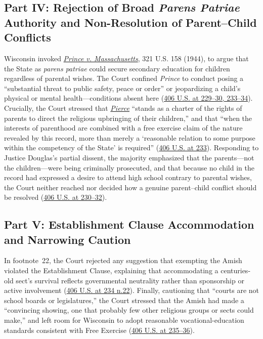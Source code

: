 \documentclass[12pt]{article}
\begin{document}
\subsection{Part IV: Rejection of Broad \emph{Parens Patriae} Authority and Non-Resolution of Parent--Child Conflicts}

Wisconsin invoked \href{https://supreme.justia.com/cases/federal/us/321/158/}{\emph{Prince v. Massachusetts}}, 321 U.S. 158 (1944), to argue that the State as \emph{parens patriae} could secure secondary education for children regardless of parental wishes. The Court confined \emph{Prince} to conduct posing a ``substantial threat to public safety, peace or order'' or jeopardizing a child's physical or mental health---conditions absent here (\href{https://supreme.justia.com/cases/federal/us/406/205/}{406 U.S. at 229--30, 233--34}). Crucially, the Court stressed that \href{https://supreme.justia.com/cases/federal/us/268/510/}{\emph{Pierce}} ``stands as a charter of the rights of parents to direct the religious upbringing of their children,'' and that ``when the interests of parenthood are combined with a free exercise claim of the nature revealed by this record, more than merely a `reasonable relation to some purpose within the competency of the State' is required'' (\href{https://supreme.justia.com/cases/federal/us/406/205/}{406 U.S. at 233}). Responding to Justice Douglas's partial dissent, the majority emphasized that the parents---not the children---were being criminally prosecuted, and that because no child in the record had expressed a desire to attend high school contrary to parental wishes, the Court neither reached nor decided how a genuine parent--child conflict should be resolved (\href{https://supreme.justia.com/cases/federal/us/406/205/}{406 U.S. at 230--32}).

\subsection{Part V: Establishment Clause Accommodation and Narrowing Caution}

In footnote~22, the Court rejected any suggestion that exempting the Amish violated the Establishment Clause, explaining that accommodating a centuries-old sect's survival reflects governmental neutrality rather than sponsorship or active involvement (\href{https://supreme.justia.com/cases/federal/us/406/205/}{406 U.S. at 234 n.22}). Finally, cautioning that ``courts are not school boards or legislatures,'' the Court stressed that the Amish had made a ``convincing showing, one that probably few other religious groups or sects could make,'' and left room for Wisconsin to adopt reasonable vocational-education standards consistent with Free Exercise (\href{https://supreme.justia.com/cases/federal/us/406/205/}{406 U.S. at 235--36}).
\end{document}

